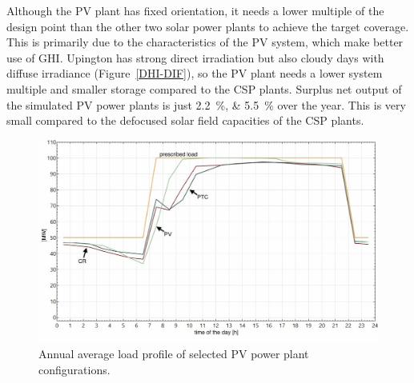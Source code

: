 
Although the PV plant has fixed orientation, it needs a lower multiple of the design point than the other two solar power plants to achieve the target coverage. This is primarily due to the characteristics of the PV system, which make better use of GHI. Upington has strong direct irradiation but also cloudy days with diffuse irradiance (Figure~\ref{DHI-DIF}), so the PV plant needs a lower system multiple and smaller storage compared to the CSP plants. Surplus net output of the simulated PV power plants is just \SIlist{2.2;5.5}{\percent} over the year. This is very small compared to the defocused solar field capacities of the CSP plants.


\begin{figure}[htbp]  
\centering
\includegraphics[width=0.8\linewidth]{FIG/90_annual_profil}
\caption{Annual average load profile of selected PV power plant configurations.}\label{90_annual_profil}
\end{figure}

